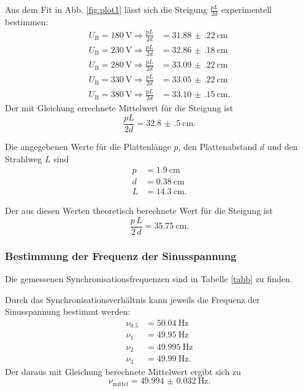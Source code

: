 \noindent Aus dem Fit in Abb. \ref{fig:plot1} lässt sich die Steigung  
$\frac{p L}{2 d}$ experimentell bestimmen:
\begin{align*} 
   U_\text{B} = \SI{180}{\volt} \Rightarrow \frac{p L}{2 d} &= \SI{31.88(22)}{\centi\meter} \\
    U_\text{B} = \SI{230}{\volt} \Rightarrow \frac{p L}{2 d} &= \SI{32.86(18)}{\centi\meter} \\
    U_\text{B} = \SI{280}{\volt} \Rightarrow \frac{p L}{2 d} &= \SI{33.09(22)}{\centi\meter} \\
    U_\text{B} = \SI{330}{\volt} \Rightarrow \frac{p L}{2 d} &= \SI{33.05(22)}{\centi\meter} \\
    U_\text{B} = \SI{380}{\volt} \Rightarrow \frac{p L}{2 d} &= \SI{33.10(15)}{\centi\meter}.
\end{align*} %
Der mit Gleichung %
errechnete Mittelwert für die Steigung ist
\begin{equation*}
    \frac{p L}{2 d} = \SI{32.8(5)}{\centi\meter}.
\end{equation*}

\noindent Die angegebenen Werte für die Plattenlänge $p$,
den Plattenabstand $d$ und den Strahlweg $L$ sind
\begin{align*}
    p &= \SI{1.9}{\centi\meter} \\
    d &= \SI{0.38}{\centi\meter} \\
    L &= \SI{14.3}{\centi\meter}.
\end{align*}

Der aus diesen Werten theoretisch berechnete Wert für die
Steigung ist
\begin{equation*}
    \frac{p \, L}{2 \, d} = \SI{35.75}{\centi\meter}.
\end{equation*}

\subsubsection{Bestimmung der Frequenz der Sinusspannung}
Die gemessenen Synchronisationsfrequenzen sind in Tabelle
\ref{tabb} zu finden. 


\noindent Durch das Synchronisationsverhältnis
kann jeweils die Frequenz der Sinusspannung bestimmt werden:
\begin{align*}
    \nu_{0.5} &= \SI{50.04}{\hertz} \\
    \nu_1 &= \SI{49.95}{\hertz} \\
    \nu_2 &= \SI{49.995}{\hertz} \\
    \nu_3 &= \SI{49.99}{\hertz}.
\end{align*}
Der daraus mit Gleichung
berechnete Mittelwert ergibt sich zu
\begin{equation*}
    \nu_\text{mittel} = \SI{49.994(32)}{\hertz}.
\end{equation*}


